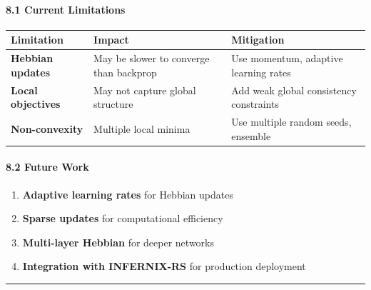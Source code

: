 \documentclass[
  11pt,
  a4paper,
]{article}
\providecommand{\tightlist}{%
  \setlength{\itemsep}{0pt}\setlength{\parskip}{0pt}}
\begin{document}
\paragraph{8.1 Current Limitations}\label{current-limitations}

\begin{longtable}[]{@{}
  >{\raggedright\arraybackslash}p{}
  >{\raggedright\arraybackslash}p{}
  >{\raggedright\arraybackslash}p{}@{}}
\toprule\noalign{}
\begin{minipage}[b]{\linewidth}\raggedright
Limitation
\end{minipage} & \begin{minipage}[b]{\linewidth}\raggedright
Impact
\end{minipage} & \begin{minipage}[b]{\linewidth}\raggedright
Mitigation
\end{minipage} \\
\midrule\noalign{}
\endhead
\bottomrule\noalign{}
\endlastfoot
\textbf{Hebbian updates} & May be slower to converge than backprop & Use
momentum, adaptive learning rates \\
\textbf{Local objectives} & May not capture global structure & Add weak
global consistency constraints \\
\textbf{Non-convexity} & Multiple local minima & Use multiple random
seeds, ensemble \\
\end{longtable}

\paragraph{8.2 Future Work}\label{future-work-4}

\begin{enumerate}
\def\labelenumi{\arabic{enumi}.}
\tightlist
\item
  \textbf{Adaptive learning rates} for Hebbian updates
\item
  \textbf{Sparse updates} for computational efficiency
\item
  \textbf{Multi-layer Hebbian} for deeper networks
\item
  \textbf{Integration with INFERNIX-RS} for production deployment
\end{enumerate}

\begin{center}\rule{0.5\linewidth}{0.5pt}\end{center}
\end{document}
